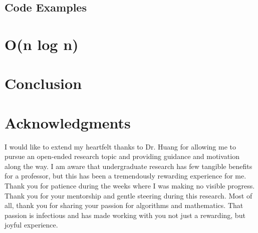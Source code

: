 \documentclass[psamsfonts,reqno]{amsart}
\theoremstyle{definition}
\theoremstyle{remark}
\numberwithin{equation}{section}
\begin{document}
\subsection{Code Examples \nopunct}

\section{O(n log n)}

\section{Conclusion}

\section*{Acknowledgments} I would like to extend my heartfelt thanks to Dr. Huang for allowing me to pursue an open-ended research topic and providing guidance and motivation along the way. I am aware that undergraduate research has few tangible benefits for a professor, but this has been a tremendously rewarding experience for me. Thank you for patience during the weeks where I was making no visible progress. Thank you for your mentorship and gentle steering during this research. Most of all, thank you for sharing your passion for algorithms and mathematics. That passion is infectious and has made working with you not just a rewarding, but joyful experience. 

\printbibliography
\end{document}
